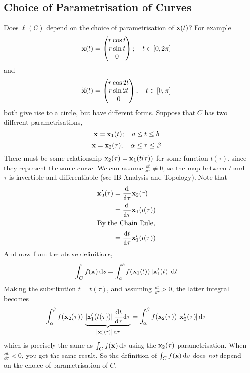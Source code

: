 \subsection{Choice of Parametrisation of Curves}
Does \(\ell(C)\) depend on the choice of parametrisation of \(\vb x(t)\)? For example,
\[
	\vb x(t) = \begin{pmatrix}
		r\cos t \\ r \sin t \\ 0
	\end{pmatrix};\quad t \in [0, 2\pi]
\]
and
\[
	\widetilde{\vb x}(t) = \begin{pmatrix}
		r\cos 2t \\ r \sin 2t \\ 0
	\end{pmatrix};\quad t \in [0, \pi]
\]
both give rise to a circle, but have different forms.
Suppose that \(C\) has two different parametrisations,
\[
	\vb x = \vb x_1(t);\quad a \leq t \leq b
\]
\[
	\vb x = \vb x_2(\tau);\quad \alpha \leq \tau \leq \beta
\]
There must be some relationship \(\vb x_2(\tau) = \vb x_1(t(\tau))\) for some function \(t(\tau)\), since they represent the same curve.
We can assume \(\frac{\dd{t}}{\dd \tau} \neq 0\), so the map between \(t\) and \(\tau\) is invertible and differentiable (see IB Analysis and Topology).
Note that
\begin{align*}
	\vb x_2'(\tau) & = \frac{\dd}{\dd \tau}\vb x_2(\tau)        \\
	               & = \frac{\dd}{\dd \tau}\vb x_1(t(\tau))     \\
	\intertext{By the Chain Rule,}
	               & = \frac{\dd{t}}{\dd \tau}\vb x_1'(t(\tau))
\end{align*}
And now from the above definitions,
\[
	\int_C f(\vb x) \dd{s} = \int_a^b f(\vb x_1(t)) \, \abs{\vb x_1'(t)} \dd{t}
\]
Making the substitution \(t = t(\tau)\), and assuming \(\frac{\dd{t}}{\dd \tau} > 0\), the latter integral becomes
\[
	\int_\alpha^\beta f(\vb x_2(\tau)) \, \underbrace{\abs{\vb x_1'(t(\tau))} \,\frac{\dd{t}}{\dd \tau}\dd \tau}_{\abs{\vb x_2'(\tau)}\,\dd \tau} = \int_\alpha^\beta f(\vb x_2(\tau)) \, \abs{\vb x_2'(\tau)} \,\dd \tau
\]
which is precisely the same as \(\int_C f(\vb x) \dd{s}\) using the \(\vb x_2(\tau)\) parametrisation.
When \(\frac{\dd{t}}{\dd \tau} < 0\), you get the same result.
So the definition of \(\int_C f(\vb x) \dd{s}\) does \textit{not} depend on the choice of parametrisation of \(C\).

